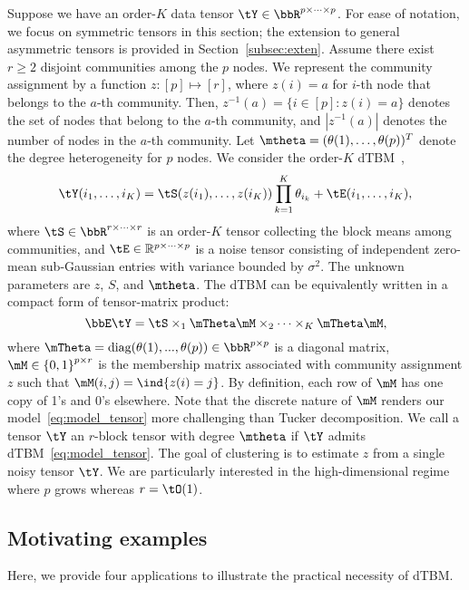 \documentclass[lettersize,onecolumn,journal]{IEEEtran}
\theoremstyle{definition}
\theoremstyle{definition}
\newcommand{\offf}[1]{\left\{#1\right\}}
\begin{document}
Suppose we have an order-$K$ data tensor $\tY \in \bbR^{p \times \cdots \times p}$. For ease of notation, we focus on symmetric tensors in this section; the extension to general asymmetric tensors is provided in Section~\ref{subsec:exten}. Assume there exist $r \geq 2$  disjoint communities among the $p$ nodes. We represent the community assignment by a function $z \colon [p]\mapsto[r]$, where $z(i) = a$ for $i$-th node that belongs to the $a$-th community. Then, $z^{-1}(a)=\{i\in[p]\colon z(i)=a\}$ denotes the set of nodes that belong to the $a$-th community, and $|z^{-1}(a)|$ denotes the number of nodes in the $a$-th community. Let $\mtheta=(\theta(1),\ldots,\theta(p))^T$ denote the degree heterogeneity for $p$ nodes. We consider the order-$K$ dTBM~\citep{ghoshdastidar2017consistency,ke2019community},
\begin{equation}\label{eq:model_margin}
    \tY(i_1,\ldots,i_K) = \tS(z(i_1),\ldots,z(i_K)) \prod_{k = 1}^K\theta_{i_k} + \tE(i_1,\ldots,i_K), 
\end{equation}
\normalsize
where $\tS \in \bbR^{r \times \cdots \times r}$ is an order-$K$ tensor collecting the block means among communities, and $\tE\in\mathbb{R}^{p\times \cdots \times p}$ is a noise tensor consisting of independent zero-mean sub-Gaussian entries with variance bounded by $\sigma^2$. The unknown parameters are $z$, $S$, and $\mtheta$. The dTBM can be equivalently written in a compact form of tensor-matrix product:
\begin{equation}\label{eq:model_tensor}
\bbE\tY = \tS \times_1 \mTheta \mM \times_2 \cdots \times_K  \mTheta \mM,
\end{equation}
where $\mTheta = \text{diag}(\theta(1),...,\theta(p)) \in \bbR^{p \times p}$ is a diagonal matrix, $\mM \in \offf{0,1}^{p \times r}$ is the membership matrix associated with community assignment $z$ such that $\mM(i,j)=\ind\{z(i)=j\}$. By definition, each row of $\mM$ has one copy of 1's and 0's elsewhere. Note that the discrete nature of $\mM$ renders our model~\eqref{eq:model_tensor} more challenging than Tucker decomposition. We call a tensor $\tY$ an $r$-block tensor with degree $\mtheta$ if $\tY$ admits dTBM~\eqref{eq:model_tensor}. The goal of clustering is to estimate $z$ from a single noisy tensor $\tY$. We are particularly interested in the high-dimensional regime where $p$ grows whereas $r=\tO(1)$. 


\subsection{Motivating examples} Here, we provide four applications to illustrate the practical necessity of dTBM.
\end{document}
